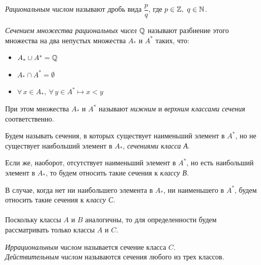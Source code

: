 

\begin{definition}
\textit{Рациональным числом} называют дробь вида \(\dfrac{p}{q}\), где \(p\in\mathbb{Z},~q\in\mathbb{N}\).
\end{definition}

\begin{definition}
\textit{Сечением множества рациональных чисел \(\mathbb{Q}\)} называют
разбиение этого множества на два непустых множества \(A_{*}\) и \(A^{*}\) таких, что:

\begin{itemize}
\item \(A_{*}\cup A^{*}=\mathbb{Q}\)
\item \(A_{*}\cap A^{*}=\emptyset\)
\item \(\forall\, x\in A_{*},~\forall\,y\in A^{*}\longmapsto x < y\)
\end{itemize}

При этом множества \(A_{*}\) и \(A^{*}\) называют
\textit{нижним} и \textit{верхним классами сечения} соответственно.
\end{definition}

\begin{notation}
Будем называть сечения, в которых существует наименьший элемент в \(A^{*}\),
но не существует наибольший элемент в \(A_{*}\), \textit{сечениями класса А}.

\vspace{2mm}

Если же, наоборот, отсутствует наименьший элемент в \(A^{*}\), но есть наибольший
элемент в \(A_{*}\), то будем относить такие сечения к \textit{классу В}.

\vspace{2mm}

В случае, когда нет ни наибольшего элемента в \(A_{*}\), ни наименьшего в \(A^{*}\),
будем относить такие сечения к \textit{классу С}.\\
\\
Поскольку классы \(A\) и \(B\) аналогичны, то для определенности будем
рассматривать только классы \(A\) и \(C\).
\end{notation}

\begin{definition}
\textit{Иррациональным числом} называется сечение класса \(C\). \\
\textit{Действительным числом} называются сечения любого из трех классов.
\end{definition}

